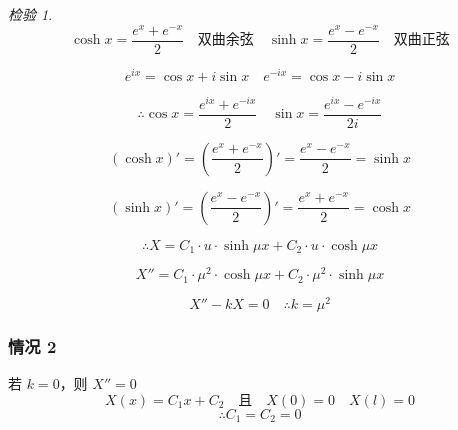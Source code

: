 \documentclass[12pt,a4paper]{article}
\numberwithin{subsection}{section}   %
\numberwithin{subsubsection}{subsection}
\theoremstyle{plain}
\theoremstyle{definition}
\theoremstyle{remark}
\theoremstyle{verification}
\newtheorem{verification}[theorem]{检验}
\begin{document}
	
	\begin{verification}	
		\begin{equation}
			\cosh x = \frac{e^x + e^{-x}}{2} \quad \text{双曲余弦} \quad \sinh x = \frac{e^x - e^{-x}}{2} \quad \text{双曲正弦}
		\end{equation}
		
		\begin{equation}
			e^{ix} = \cos x + i \sin x \quad e^{-ix} = \cos x - i \sin x
		\end{equation}
		
		\begin{equation}
			\therefore \cos x = \frac{e^{ix} + e^{-ix}}{2} \quad \sin x = \frac{e^{ix} - e^{-ix}}{2i}
		\end{equation}
		
		\begin{equation}
			(\cosh x)' = \left( \frac{e^x + e^{-x}}{2} \right)' = \frac{e^x - e^{-x}}{2} = \sinh x
		\end{equation}
		
		\begin{equation}
			(\sinh x)' = \left( \frac{e^x - e^{-x}}{2} \right)' = \frac{e^x + e^{-x}}{2} = \cosh x
		\end{equation}
		
		\begin{equation}
			\therefore X = C_1 \cdot u \cdot \sinh \mu x + C_2 \cdot u \cdot \cosh \mu x
		\end{equation}
		
		\begin{equation}
			X'' = C_1 \cdot \mu^2 \cdot \cosh \mu x + C_2 \cdot \mu^2 \cdot \sinh \mu x
		\end{equation}
		
		\begin{equation}
			X'' - kX = 0 \quad \therefore k = \mu^2
		\end{equation}
		
	\end{verification}	
	
	
	\subsubsection{情况 2}
	若 \(k = 0\)，则 \(X'' = 0\)
	\begin{equation}
		X(x) = C_1 x + C_2 \quad \text{且} \quad X(0) = 0 \quad X(l) = 0
	\end{equation}
	\begin{equation}
		\therefore C_1 = C_2 = 0
	\end{equation}
	
\end{document}
